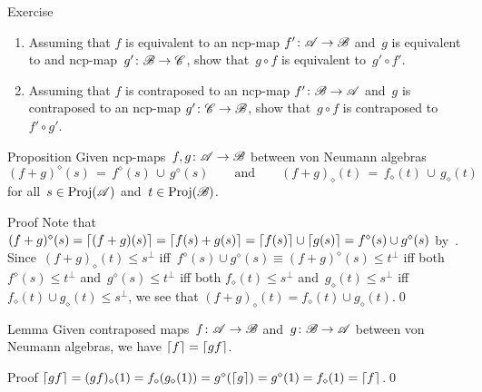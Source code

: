 \documentclass[a]{subfiles}
\begin{document}
\begin{parsec}
\begin{point}{Exercise}
\begin{enumerate}
\item
Assuming that $f$ is equivalent 
to an ncp-map $f'\colon \mathscr{A}\to\mathscr{B}$
and~$g$ is equivalent to
and ncp-map~$g'\colon \mathscr{B}\to\mathscr{C}$,
show that~$g\circ f$ is equivalent to~$g'\circ f'$.
\item
Assuming that $f$ is contraposed to
an ncp-map $f'\colon \mathscr{B}\to\mathscr{A}$
and~$g$ is contraposed to
an ncp-map $g'\colon \mathscr{C}\to\mathscr{B}$,
show that~$g\circ f$ is contraposed to~$f'\circ g'$.
\end{enumerate}
\end{point}
\begin{point}{Proposition}%
Given ncp-maps~$f,g\colon \mathscr{A}\to\mathscr{B}$
between von Neumann algebras
\begin{equation*}
(f+g)^\diamond(s) \,=\, f^\diamond(s)\, \cup\, g^\diamond(s)
\qquad
\text{and}
\qquad (f+g)_\diamond(t)\, =\, f_\diamond(t) \,\cup\, g_\diamond(t)
\end{equation*}
for all~$s\in \operatorname{Proj}(\mathscr{A})$ and~$t\in \operatorname{Proj}(\mathscr{B})$.
\begin{point}{Proof}%
Note that $(f+g)^\diamond(s)
=  \left\lceil(f+g)(s)\right\rceil
= \left\lceil f(s)+g(s)\right\rceil
= \left\lceil f(s)\right\rceil\cup \left\lceil g(s)\right\rceil
= f^\diamond(s) \cup g^\diamond(s)$
by~.
Since~$(f+g)_\diamond(t)\leq s^\perp$
iff~$f^\diamond(s)\cup g^\diamond(s)\equiv (f+g)^\diamond(s)\leq t^\perp$
iff both $f^\diamond(s)\leq t^\perp$ and~$g^\diamond(s)\leq t^\perp$
iff both $f_\diamond(t)\leq s^\perp$ and~$g_\diamond(t)\leq s^\perp$
iff~$f_\diamond(t)\cup g_\diamond(t)\leq s^\perp$,
we see that $(f+g)_\diamond(t)=f_\diamond(t)\cup g_\diamond(t)$.\qed
\end{point}
\end{point}
\begin{point}{Lemma}%
Given contraposed
maps~$f\colon \mathscr{A}\to\mathscr{B}$
and~$g\colon \mathscr{B}\to\mathscr{A}$ between von Neumann algebras,
we have $\left\lceil f\right\rceil=\left\lceil gf\right\rceil$.
\begin{point}{Proof}%
$\left\lceil gf\right\rceil=(gf)_\diamond(1)
= f_\diamond(g_\diamond(1))
= g^\diamond(\left\lceil g\right\rceil)
= g^\diamond(1)=f_\diamond(1)=\left\lceil f\right\rceil$.\qed
\end{point}
\end{point}
\end{parsec}
\end{document}
